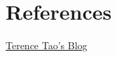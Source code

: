 \documentclass{article}
\begin{document}
\section{References}

\href{http://terrytao.wordpress.com/2015/01/04/254a-supplement-4-probabilistic-models-and-heuristics-for-the-primes-optional/#more-7956}{Terence Tao's Blog}

 
\end{document}
